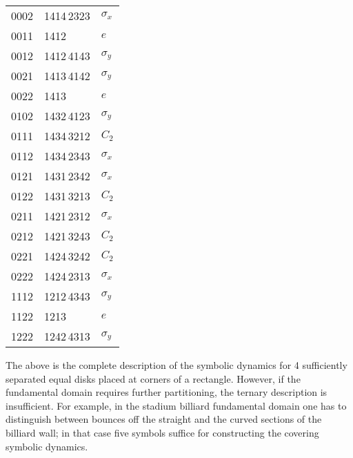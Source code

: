 \begin{table}
{\begin{tabular}{lll}
0002    &  1414\,2323 & ${\sigma}_x$ \\
0011    &       1412              & ${ e}$ \\
0012    &       1412\,4143        & ${ \sigma}_y$ \\
0021    &       1413\,4142        & ${ \sigma}_y$ \\
0022    &       1413              & ${ e}$ \\
0102    &       1432\,4123        & ${ \sigma}_y$ \\
0111    &       1434\,3212        &       ${ C}_2$ \\
0112    &       1434\,2343        &       ${ \sigma}_x$ \\
0121    &       1431\,2342        &       ${ \sigma}_x$ \\
0122    &       1431\,3213        &       ${ C}_2$ \\
0211    &       1421\,2312        &       ${ \sigma}_x$ \\
0212    &       1421\,3243        &       ${ C}_2$ \\
0221    &       1424\,3242        &       ${ C}_2$ \\
0222    &       1424\,2313        &       ${ \sigma}_x$ \\
1112    &       1212\,4343        &       ${ \sigma}_y$ \\
1122    &       1213    &       ${ e}$ \\
1222    &       1242\,4313        &       ${ \sigma}_y$
\end{tabular}
} %
\label{t-symm-7}
\end{table}


The above is the complete description of the symbolic dynamics for 4
sufficiently separated equal
disks placed at corners of a rectangle. However, if
the fundamental domain requires further partitioning, the ternary description is
insufficient. For example, in the stadium billiard fundamental domain one has
to distinguish between bounces off the straight and the curved sections of the
billiard wall; in that case five symbols suffice for
constructing the covering symbolic dynamics.

